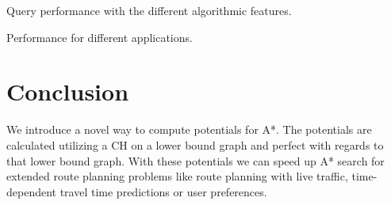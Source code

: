 \documentclass[sigconf]{acmart}
\begin{document}
\begin{table}
\centering
\caption{Query performance with the different algorithmic features.}\label{tab:building_blocks}

\end{table}

\begin{table}
\centering
\caption{Performance for different applications.}\label{tab:applications}

\end{table}

\section{Conclusion}
\label{sec:conclusion}

We introduce a novel way to compute potentials for A*.
The potentials are calculated utilizing a CH on a lower bound graph and perfect with regards to that lower bound graph.
With these potentials we can speed up A* search for extended route planning problems like route planning with live traffic, time-dependent travel time predictions or user preferences.






\end{document}
